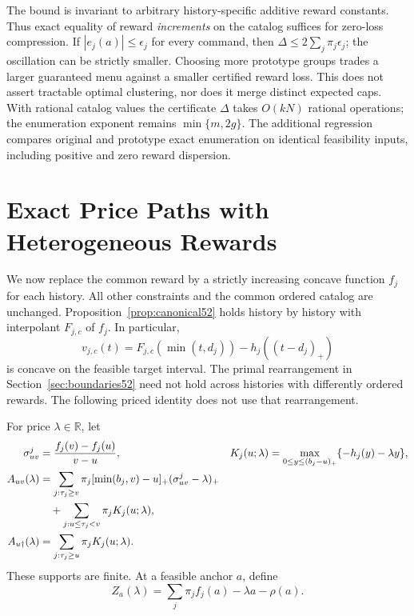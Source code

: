 \documentclass[11pt,letterpaper]{article}
\theoremstyle{definition}\newtheorem{remark}[theorem]{Remark}
\begin{document}
The bound is invariant to arbitrary history-specific additive reward constants. Thus exact equality of reward \emph{increments} on the catalog suffices for zero-loss compression. If $|e_j(a)|\leq\epsilon_j$ for every command, then $\Delta\leq2\sum_j\pi_j\epsilon_j$; the oscillation can be strictly smaller. Choosing more prototype groups trades a larger guaranteed menu against a smaller certified reward loss. This does not assert tractable optimal clustering, nor does it merge distinct expected caps. With rational catalog values the certificate $\Delta$ takes $O(kN)$ rational operations; the enumeration exponent remains $\min\{m,2g\}$. The additional regression compares original and prototype exact enumeration on identical feasibility inputs, including positive and zero reward dispersion.
\section{Exact Price Paths with Heterogeneous Rewards}\label{sec:price54}
We now replace the common reward by a strictly increasing concave function $f_j$ for each history. All other constraints and the common ordered catalog are unchanged. Proposition~\ref{prop:canonical52} holds history by history with interpolant $F_{j,c}$ of $f_j$. In particular,
\[
 v_{j,c}(t)=F_{j,c}(\min(t,d_j))-h_j((t-d_j)_+)
\]
is concave on the feasible target interval. The primal rearrangement in Section~\ref{sec:boundaries52} need not hold across histories with differently ordered rewards. The following priced identity does not use that rearrangement.

For price $\lambda\in\mathbb R$, let
\begin{align}
 \sigma^j_{uv}&=\frac{f_j(v)-f_j(u)}{v-u},&
 K_j(u;\lambda)&=\max_{0\leq y\leq(b_j-u)_+}\{-h_j(y)-\lambda y\},\label{eq:pricedpieces54}\\
 A_{uv}(\lambda)&=\sum_{j:\tau_j\geq v}\pi_j[\min(b_j,v)-u]_+(\sigma^j_{uv}-\lambda)_+\notag\\
 &\quad+\sum_{j:u\leq\tau_j<v}\pi_jK_j(u;\lambda),\label{eq:pricedarc54}\\
 A_{u\dagger}(\lambda)&=\sum_{j:\tau_j\geq u}\pi_jK_j(u;\lambda).\label{eq:pricedtail54}
\end{align}
These supports are finite. At a feasible anchor $a$, define
\[
 Z_a(\lambda)=\sum_j\pi_jf_j(a)-\lambda a-\rho(a).
\]
\end{document}
